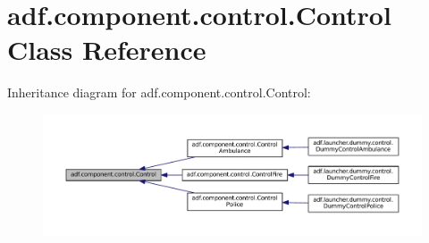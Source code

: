 \hypertarget{classadf_1_1component_1_1control_1_1Control}{}\section{adf.\+component.\+control.\+Control Class Reference}
\label{classadf_1_1component_1_1control_1_1Control}


Inheritance diagram for adf.\+component.\+control.\+Control\+:
\nopagebreak
\begin{figure}[H]
\begin{center}
\leavevmode
\includegraphics[width=350pt]{classadf_1_1component_1_1control_1_1Control__inherit__graph}
\end{center}
\end{figure}
